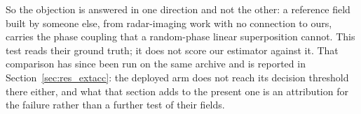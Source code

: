 \documentclass[review]{elsarticle}
\begin{document}
So the objection is answered in one direction and not the other: a reference field
built by someone else, from radar-imaging work with no connection to ours, carries the
phase coupling that a random-phase linear superposition cannot. This test reads their
ground truth; it does not score our estimator against it.
That comparison has since been run on the same archive
and is reported in Section~\ref{sec:res_extacc}: the deployed arm does not reach its
decision threshold there either, and what that section adds to the present one is an
attribution for the failure rather than a further test of their fields.
\end{document}
